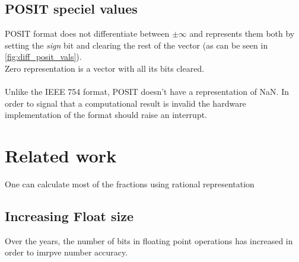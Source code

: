 \documentclass[10pt]{article}
\begin{document}
\subsection{POSIT speciel values}\label{sec:posit-speciel-values}

POSIT format does not differentiate between $\pm\infty$ and represents them both
by setting the \textit{sign} bit and clearing the rest of the vector (as can be
seen in \autoref{fig:diff_posit_vals}). \\
Zero representation is a vector with all its bits cleared.

\paragraph{}
Unlike the IEEE 754 format, POSIT doesn't have a representation of NaN. In order
to signal that a computational result is invalid the hardware implementation of
the format should raise an interrupt.

\section{Related work}\label{sec:relatedwork}


One can calculate most of the fractions using rational representation

\subsection{Increasing Float size}\label{sec:increasefloat}

Over the years, the number of bits in floating point operations has
increased in order to imrpve number accuracy.
\end{document}
